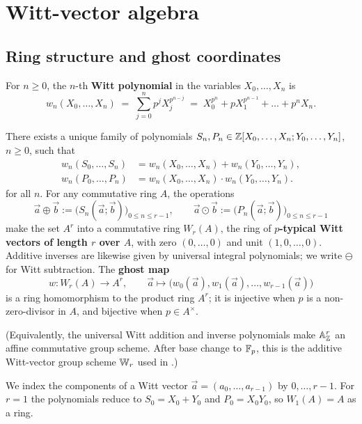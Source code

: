 \section{Witt-vector algebra}
\label{appendix:witt_vector_algebra_basics}

\subsection{Ring structure and ghost coordinates}

For $n \geq 0$, the $n$-th \textbf{Witt polynomial} in the variables $X_0, \dots, X_n$
is
\[
w_n(X_0, \dots, X_n) \;=\; \sum_{j=0}^{n} p^j X_j^{p^{n-j}}
\;=\; X_0^{p^n} + p X_1^{p^{n-1}} + \dots + p^n X_n .
\]

\begin{theorem}
\label{theorem:witt_ring_structure}
There exists a unique family of polynomials
$S_n, P_n \in \mathbb{Z}[X_0, \dots, X_n; Y_0, \dots, Y_n]$, $n \geq 0$, such that
\[
\begin{aligned}
w_n(S_0, \dots, S_n)
    &= w_n(X_0,\dots,X_n) + w_n(Y_0,\dots,Y_n),\\
w_n(P_0, \dots, P_n)
    &= w_n(X_0,\dots,X_n) \cdot w_n(Y_0,\dots,Y_n).
\end{aligned}
\]
for all $n$. For any commutative ring $A$, the operations
\[
\vec a \oplus \vec b := \bigl(S_n(\vec a; \vec b)\bigr)_{0 \le n \le r-1},
\qquad
\vec a \odot \vec b := \bigl(P_n(\vec a; \vec b)\bigr)_{0 \le n \le r-1}
\]
make the set $A^r$ into a commutative ring $W_r(A)$, the ring of \textbf{$p$-typical
Witt vectors of length $r$ over $A$}, with zero $(0, \dots, 0)$ and unit
$(1, 0, \dots, 0)$. Additive inverses are likewise given by universal integral
polynomials; we write $\ominus$ for Witt subtraction. The \textbf{ghost map}
\[
w \colon W_r(A) \longrightarrow A^r,
\qquad
\vec a \longmapsto \bigl(w_0(\vec a), w_1(\vec a), \dots, w_{r-1}(\vec a)\bigr)
\]
is a ring homomorphism to the product ring $A^r$; it is injective when $p$ is a
non-zero-divisor in $A$, and bijective when $p \in A^\times$.
\end{theorem}

(Equivalently, the universal Witt addition and inverse polynomials make
$\mathbb{A}^r_{\mathbb{Z}}$ an affine commutative group scheme. After base change to
$\mathbb{F}_p$, this is the additive Witt-vector group scheme $\mathbb{W}_r$ used in
.)

We index the components of a Witt vector $\vec a = (a_0, \dots, a_{r-1})$ by
$0, \dots, r-1$. For $r = 1$ the polynomials reduce to $S_0 = X_0 + Y_0$ and
$P_0 = X_0 Y_0$, so $W_1(A) = A$ as a ring.

